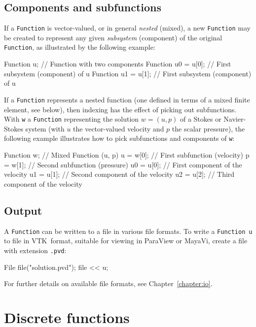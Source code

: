 \subsection{Components and subfunctions}

If a \texttt{Function} is vector-valued, or in general \emph{nested}
(mixed), a new \texttt{Function} may be created to represent any given
\emph{subsystem} (component) of the original \texttt{Function}, as
illustrated by the following example:
\begin{code}
Function u;         // Function with two components
Function u0 = u[0]; // First subsystem (component) of u
Function u1 = u[1]; // First subsystem (component) of u
\end{code}

If a \texttt{Function} represents a nested function (one defined in
terms of a mixed finite element, see below), then indexing has the
effect of picking out subfunctions. With \texttt{w} a
\texttt{Function} representing the solution $w = (u, p)$ of a Stokes
or Navier-Stokes system (with $u$ the vector-valued velocity and $p$
the scalar pressure), the following example illustrates how to pick
subfunctions and components of \texttt{w}:
\begin{code}
Function w; // Mixed Function (u, p)
u = w[0];   // First subfunction (velocity)
p = w[1];   // Second subfunction (pressure)
u0 = u[0];  // First component of the velocity
u1 = u[1];  // Second component of the velocity
u2 = u[2];  // Third component of the velocity
\end{code}

\subsection{Output}

A \texttt{Function} can be written to a file in various file formats.
To write a \texttt{Function}~\texttt{u} to file in VTK~format,
suitable for viewing in ParaView or MayaVi, create a file with
extension \texttt{.pvd}:
\begin{code}
File file("solution.pvd");
file << u;
\end{code}

For further details on available file formats, see
Chapter~\ref{chapter:io}.

\section{Discrete functions}

